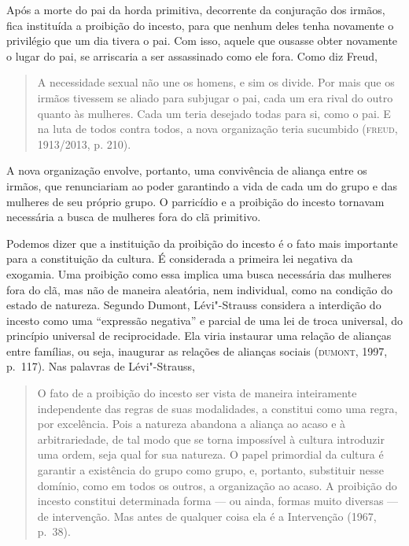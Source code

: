Após a morte do pai da horda primitiva, decorrente da conjuração dos
irmãos, fica instituída a proibição do incesto, para que nenhum deles
tenha novamente o privilégio que um dia tivera o pai. Com isso, aquele
que ousasse obter novamente o lugar do pai, se arriscaria a ser
assassinado como ele fora. Como diz Freud,

\begin{quote}
A necessidade sexual não une os homens, e sim os divide. Por mais que os
irmãos tivessem se aliado para subjugar o pai, cada um era rival do
outro quanto às mulheres. Cada um teria desejado todas para si, como o
pai. E na luta de todos contra todos, a nova organização teria
sucumbido (\textsc{freud}, 1913/2013, p. 210).
\end{quote}

A nova organização envolve, portanto, uma convivência de aliança entre
os irmãos, que renunciariam ao poder garantindo a vida de cada um do
grupo e das mulheres de seu próprio grupo. O parricídio e a proibição do
incesto tornavam necessária a busca de mulheres fora do clã primitivo.

Podemos dizer que a instituição da proibição do incesto é o fato mais
importante para a constituição da cultura. É considerada a primeira lei
negativa da exogamia. Uma proibição como essa implica uma busca
necessária das mulheres fora do clã, mas não de maneira aleatória, nem
individual, como na condição do estado de natureza. Segundo Dumont,
Lévi"-Strauss considera a interdição do incesto como uma ``expressão
negativa'' e parcial de uma lei de troca universal, do princípio
universal de reciprocidade. Ela viria instaurar uma relação de alianças
entre famílias, ou seja, inaugurar as relações de alianças sociais
(\textsc{dumont}, 1997, p.~117). Nas palavras de Lévi"-Strauss,

\begin{quote}
O fato de a proibição do incesto ser vista de maneira inteiramente
independente das regras de suas modalidades, a constitui como uma regra,
por excelência. Pois a natureza abandona a aliança ao acaso e à
arbitrariedade, de tal modo que se torna impossível à cultura introduzir
uma ordem, seja qual for sua natureza. O papel primordial da cultura é
garantir a existência do grupo como grupo, e, portanto, substituir nesse
domínio, como em todos os outros, a organização ao acaso. A proibição do
incesto constitui determinada forma --- ou ainda, formas muito diversas
--- de intervenção. Mas antes de qualquer coisa ela é a Intervenção
(1967, p.~38).
\end{quote}

